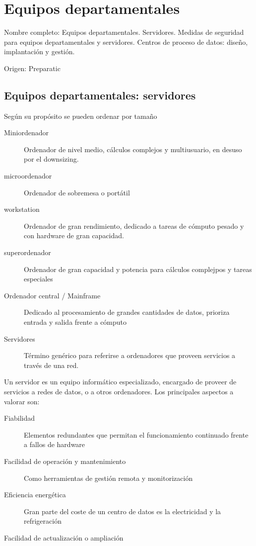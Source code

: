 \setcounter{section}{52}
\section{Equipos departamentales}

Nombre completo: Equipos departamentales. Servidores. Medidas de seguridad para equipos departamentales y servidores. Centros de proceso de datos: diseño, implantación y gestión.

Origen: Preparatic

\localtableofcontents

\subsection{Equipos departamentales: servidores}

Según su propósito se pueden ordenar por tamaño

\begin{description}
    \item[Miniordenador] Ordenador de nivel medio, cálculos complejos y multiusuario, en desuso por el downsizing.
    \item[microordenador] Ordenador de sobremesa o portátil
    \item[workstation] Ordenador de gran rendimiento, dedicado a tareas de cómputo pesado y con hardware de gran capacidad.
    \item[superordenador] Ordenador de gran capacidad y potencia para cálculos complejpos y tareas especiales
    \item[Ordenador central / Mainframe] Dedicado al procesamiento de grandes cantidades de datos, prioriza entrada y salida frente a cómputo
    \item[Servidores] Término genérico para referirse a ordenadores que proveen servicios a través de una red.
\end{description}

Un servidor es un equipo informático especializado, encargado de proveer de servicios a redes de datos, o a otros ordenadores. Los principales aspectos a valorar son:

\begin{description}
    \item[Fiabilidad] Elementos redundantes que permitan el funcionamiento continuado frente a fallos de hardware
    \item[Facilidad de operación y mantenimiento] Como herramientas de gestión remota y monitorización
    \item[Eficiencia energética] Gran parte del coste de un centro de datos es la electricidad y la refrigeración
    \item[Facilidad de actualización o ampliación]
\end{description}

